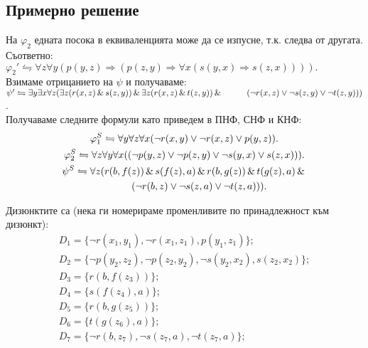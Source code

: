 \documentclass[12pt]{article}
\def\Land{\,\&\,}
\begin{document}
\subsection{Примерно решение}
\begin{addmargin}[1em]{2em}
    На $\varphi_2$ едната посока в еквиваленцията може да се изпусне, т.к. следва от другата. Съответно: \\
    $\varphi_{2}'\leftrightharpoons\forall z \forall y(p(y, z) \Rightarrow(p(z, y) \Rightarrow \forall x(s(y, x) \Rightarrow s(z, x)))).$\\
    Взимаме отрицанието на $\psi$ и получаваме:\\
    $\psi' \leftrightharpoons \exists y \exists x \forall z(\exists z(r(x, z)\Land s(z, y))\Land \exists z(r(x, z)\Land t(z, y))\Land \\\indent\indent(\neg r(x, z)\lor\neg s(z, y)\lor\neg t(z, y)))$.\\
Получаваме следните формули като приведем в ПНФ, СНФ и КНФ: \\
\begin{gather*}
    \varphi_1^S \leftrightharpoons \forall y \forall z \forall x (\neg r(x,y) \lor \neg r(x, z) \lor p(y,z)).  \\
    \varphi_2^S \leftrightharpoons \forall z \forall y \forall x ((\neg p(y,z) \lor \neg p(z, y) \lor \neg s(y,x) \lor s(z,x))).  \\
    \psi^S \leftrightharpoons \forall z (r(b,f(z)) \Land s(f(z), a) \Land r(b, g(z)) \Land t(g(z), a) \Land \\\indent\indent(\neg r(b,z) \lor \neg s(z, a) \lor \neg t(z, a))). \\
\end{gather*}

Дизюнктите са (нека ги номерираме променливите по принадлежност към дизюнкт): \\
\begin{gather*}
    D_1 = \{ \neg r(x_1,y_1), \neg r(x_1, z_1), p(y_1, z_1)\}; \\
    D_2 = \{ \neg p(y_2, z_2), \neg p(z_2, y_2), \neg s(y_2, x_2), s(z_2, x_2)\}; \\
    D_3 = \{ r(b,f(z_3))\}; \\
    D_4 = \{ s(f(z_4),a)\}; \\        
    D_5 = \{ r(b,g(z_5))\}; \\        
    D_6 = \{ t(g(z_6),a)\}; \\        
    D_7 = \{ \neg r(b, z_7), \neg s(z_7,a), \neg t(z_7, a)\}; \\
\end{gather*}


\end{addmargin}
\end{document}
